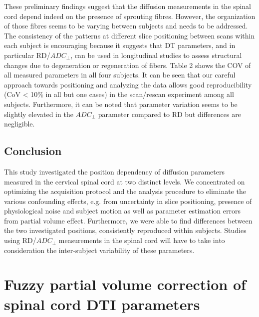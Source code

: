 These preliminary findings suggest that the diffusion measurements in the spinal cord depend indeed on the presence of sprouting fibres. However, the organization of those fibres seems to be varying between subjects and needs to be addressed. The consistency of the patterns at different slice positioning between scans within each subject is encouraging because it suggests that DT parameters, and in particular RD/$ADC_\perp$, can be used in longitudinal studies to assess structural changes due to degeneration or regeneration of fibers. Table 2 shows the COV of all measured parameters in all four subjects. It can be seen that our careful approach towards positioning and analyzing the data allows good reproducibility (CoV < 10$\%$ in all but one cases) in the scan/rescan experiment among all subjects. Furthermore, it can be noted that parameter variation seems to be slightly elevated in the $ADC_\perp$ parameter compared to RD but differences are negligible.

\subsection*{Conclusion}
This study investigated the position dependency of diffusion parameters measured in the cervical spinal cord at two distinct levels. We concentrated on optimizing the acquisition protocol and the analysis procedure to eliminate the various confounding effects, e.g. from uncertainty in slice positioning, presence of physiological noise and subject motion as well as parameter estimation errors from partial volume effect. Furthermore, we were able to find differences between the two investigated positions, consistently reproduced within subjects. Studies using RD/$ADC_\perp$ measurements in the spinal cord will have to take into consideration the inter-subject variability of these parameters.
 
\section{Fuzzy partial volume correction of spinal cord DTI parameters}
